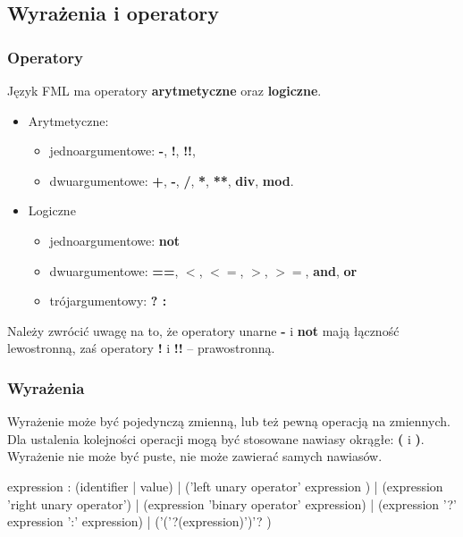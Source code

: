 \documentclass[12pt,a4paper]{article}
\begin{document}
\subsection{Wyrażenia i operatory}

\subsubsection{Operatory}
Język FML ma operatory \textbf{arytmetyczne} oraz \textbf{logiczne}.

\medskip
\begin{itemize}
  \item Arytmetyczne: 
  \begin{itemize}

    \item jednoargumentowe: 
    \textbf{-}, \textbf{!}, \textbf{!!},
  
    \item dwuargumentowe:
    \textbf{+}, \textbf{-}, \textbf{/}, \textbf{*}, \textbf{**}, \textbf{div}, \textbf{mod}.
    
  \end{itemize}
  
  \item Logiczne
  \begin{itemize}
  
    \item jednoargumentowe:
    \textbf{not}
    \item dwuargumentowe:
    \textbf{==}, \textbf{$<$}, \textbf{$<=$}, \textbf{$>$}, \textbf{$>=$}, \textbf{and}, \textbf{or} 
    \item trójargumentowy:
    \textbf{? :}
  \end{itemize}
\end{itemize}

Należy zwrócić uwagę na to, że operatory unarne \textbf{-} i \textbf{not} mają łączność lewostronną, zaś operatory \textbf{!} i \textbf{!!} -- prawostronną.

\subsubsection{Wyrażenia}

Wyrażenie może być pojedynczą zmienną, lub też pewną operacją na zmiennych. Dla ustalenia kolejności operacji mogą być stosowane nawiasy okrągłe: \textbf{(} i \textbf{)}. Wyrażenie nie może być puste, nie może zawierać samych nawiasów.

\begin{rail}

expression : (identifier | value) | ('left unary operator' expression ) | (expression 'right unary operator') | (expression 'binary operator' expression) | (expression '?' expression ':' expression) | ('('?(expression)')'? )

\end{rail}
\end{document}
